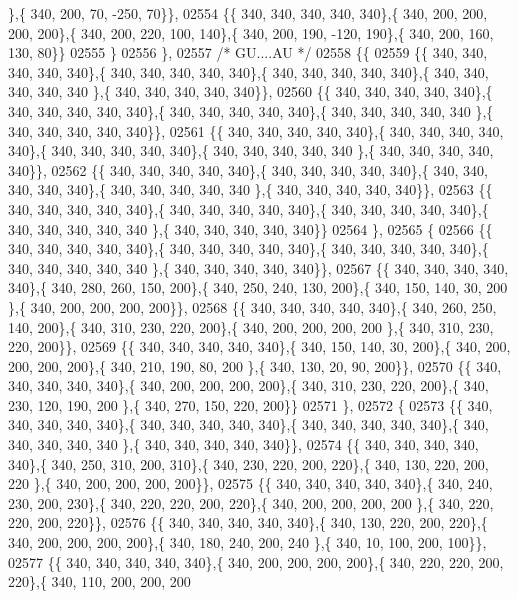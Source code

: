 \begin{DoxyCode}
      \},\{ 340, 200,  70, -250,  70\}\},
02554 \{\{ 340, 340, 340, 340, 340\},\{ 340, 200, 200, 200, 200\},\{ 340, 200, 220, 100, 140\},\{ 340, 200, 190, -120, 
      190\},\{ 340, 200, 160, 130,  80\}\}
02555 \}
02556 \},
02557 \textcolor{comment}{/* GU....AU */}
02558 \{\{
02559 \{\{ 340, 340, 340, 340, 340\},\{ 340, 340, 340, 340, 340\},\{ 340, 340, 340, 340, 340\},\{ 340, 340, 340, 340, 340
      \},\{ 340, 340, 340, 340, 340\}\},
02560 \{\{ 340, 340, 340, 340, 340\},\{ 340, 340, 340, 340, 340\},\{ 340, 340, 340, 340, 340\},\{ 340, 340, 340, 340, 340
      \},\{ 340, 340, 340, 340, 340\}\},
02561 \{\{ 340, 340, 340, 340, 340\},\{ 340, 340, 340, 340, 340\},\{ 340, 340, 340, 340, 340\},\{ 340, 340, 340, 340, 340
      \},\{ 340, 340, 340, 340, 340\}\},
02562 \{\{ 340, 340, 340, 340, 340\},\{ 340, 340, 340, 340, 340\},\{ 340, 340, 340, 340, 340\},\{ 340, 340, 340, 340, 340
      \},\{ 340, 340, 340, 340, 340\}\},
02563 \{\{ 340, 340, 340, 340, 340\},\{ 340, 340, 340, 340, 340\},\{ 340, 340, 340, 340, 340\},\{ 340, 340, 340, 340, 340
      \},\{ 340, 340, 340, 340, 340\}\}
02564 \},
02565 \{
02566 \{\{ 340, 340, 340, 340, 340\},\{ 340, 340, 340, 340, 340\},\{ 340, 340, 340, 340, 340\},\{ 340, 340, 340, 340, 340
      \},\{ 340, 340, 340, 340, 340\}\},
02567 \{\{ 340, 340, 340, 340, 340\},\{ 340, 280, 260, 150, 200\},\{ 340, 250, 240, 130, 200\},\{ 340, 150, 140,  30, 200
      \},\{ 340, 200, 200, 200, 200\}\},
02568 \{\{ 340, 340, 340, 340, 340\},\{ 340, 260, 250, 140, 200\},\{ 340, 310, 230, 220, 200\},\{ 340, 200, 200, 200, 200
      \},\{ 340, 310, 230, 220, 200\}\},
02569 \{\{ 340, 340, 340, 340, 340\},\{ 340, 150, 140,  30, 200\},\{ 340, 200, 200, 200, 200\},\{ 340, 210, 190,  80, 200
      \},\{ 340, 130,  20,  90, 200\}\},
02570 \{\{ 340, 340, 340, 340, 340\},\{ 340, 200, 200, 200, 200\},\{ 340, 310, 230, 220, 200\},\{ 340, 230, 120, 190, 200
      \},\{ 340, 270, 150, 220, 200\}\}
02571 \},
02572 \{
02573 \{\{ 340, 340, 340, 340, 340\},\{ 340, 340, 340, 340, 340\},\{ 340, 340, 340, 340, 340\},\{ 340, 340, 340, 340, 340
      \},\{ 340, 340, 340, 340, 340\}\},
02574 \{\{ 340, 340, 340, 340, 340\},\{ 340, 250, 310, 200, 310\},\{ 340, 230, 220, 200, 220\},\{ 340, 130, 220, 200, 220
      \},\{ 340, 200, 200, 200, 200\}\},
02575 \{\{ 340, 340, 340, 340, 340\},\{ 340, 240, 230, 200, 230\},\{ 340, 220, 220, 200, 220\},\{ 340, 200, 200, 200, 200
      \},\{ 340, 220, 220, 200, 220\}\},
02576 \{\{ 340, 340, 340, 340, 340\},\{ 340, 130, 220, 200, 220\},\{ 340, 200, 200, 200, 200\},\{ 340, 180, 240, 200, 240
      \},\{ 340,  10, 100, 200, 100\}\},
02577 \{\{ 340, 340, 340, 340, 340\},\{ 340, 200, 200, 200, 200\},\{ 340, 220, 220, 200, 220\},\{ 340, 110, 200, 200, 200

\end{DoxyCode}

